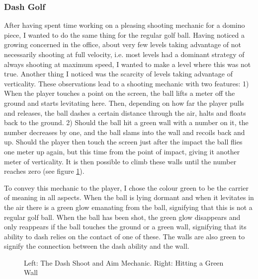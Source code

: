 \subsubsection{Dash Golf}
After having spent time working on a pleasing shooting mechanic for a domino piece, I wanted to do the same thing for the regular golf ball. Having noticed a growing concerned in the office, about very few levels taking advantage of not necessarily shooting at full velocity, i.e. most levels had a dominant strategy of always shooting at maximum speed, I wanted to make a level where this was not true. Another thing I noticed was the scarcity of levels taking advantage of verticality. These observations lead to a shooting mechanic with two features: 1) When the player touches a point on the screen, the ball lifts a meter off the ground and starts levitating here. Then, depending on how far the player pulls and releases, the ball dashes a certain distance through the air, halts and floats back to the ground. 2) Should the ball hit a green wall with a number on it, the number decreases by one, and the ball slams into the wall and recoils back and up. Should the player then touch the screen just after the impact the ball flies one meter up again, but this time from the point of impact, giving it another meter of verticality. It is then possible to climb these walls until the number reaches zero (see figure \ref{Dash}).

To convey this mechanic to the player, I chose the colour green to be the carrier of meaning in all aspects. When the ball is lying dormant and when it levitates in the air there is a green glow emanating from the ball, signifying that this is not a regular golf ball. When the ball has been shot, the green glow disappears and only reappears if the ball touches the ground or a green wall, signifying that its ability to dash relies on the contact of one of these. The walls are also green to signify the connection between the dash ability and the wall.
\begin{center}
  \begin{figure}[!htb]
    \noindent{}
    \caption{Left: The Dash Shoot and Aim Mechanic. Right: Hitting a Green Wall}
    \label{Dash}
  \end{figure}
\end{center}
